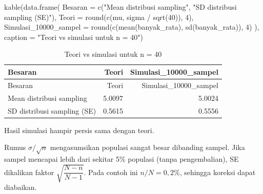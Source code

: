 \documentclass[
  indonesian,
  letterpaper,
]{book}
\newenvironment{Shaded}{\begin{snugshade}}{\end{snugshade}}
\newcommand{\AttributeTok}[1]{\textcolor[rgb]{0.40,0.45,0.13}{#1}}
\newcommand{\DecValTok}[1]{\textcolor[rgb]{0.68,0.00,0.00}{#1}}
\newcommand{\FunctionTok}[1]{\textcolor[rgb]{0.28,0.35,0.67}{#1}}
\newcommand{\NormalTok}[1]{\textcolor[rgb]{0.00,0.23,0.31}{#1}}
\newcommand{\SpecialCharTok}[1]{\textcolor[rgb]{0.37,0.37,0.37}{#1}}
\newcommand{\StringTok}[1]{\textcolor[rgb]{0.13,0.47,0.30}{#1}}
\begin{document}
\begin{Shaded}
\begin{Highlighting}[]
\FunctionTok{kable}\NormalTok{(}\FunctionTok{data.frame}\NormalTok{(}
  \AttributeTok{Besaran =} \FunctionTok{c}\NormalTok{(}\StringTok{"Mean distribusi sampling"}\NormalTok{, }\StringTok{"SD distribusi sampling (SE)"}\NormalTok{),}
  \AttributeTok{Teori   =} \FunctionTok{round}\NormalTok{(}\FunctionTok{c}\NormalTok{(mu, sigma }\SpecialCharTok{/} \FunctionTok{sqrt}\NormalTok{(}\DecValTok{40}\NormalTok{)), }\DecValTok{4}\NormalTok{),}
  \AttributeTok{Simulasi\_10000\_sampel =} \FunctionTok{round}\NormalTok{(}\FunctionTok{c}\NormalTok{(}\FunctionTok{mean}\NormalTok{(banyak\_rata), }\FunctionTok{sd}\NormalTok{(banyak\_rata)), }\DecValTok{4}\NormalTok{)}
\NormalTok{), }\AttributeTok{caption =} \StringTok{"Teori vs simulasi untuk n = 40"}\NormalTok{)}
\end{Highlighting}
\end{Shaded}

\begin{longtable}[]{@{}lrr@{}}
\caption{Teori vs simulasi untuk n = 40}\tabularnewline
\toprule\noalign{}
Besaran & Teori & Simulasi\_10000\_sampel \\
\midrule\noalign{}
\endfirsthead
\toprule\noalign{}
Besaran & Teori & Simulasi\_10000\_sampel \\
\midrule\noalign{}
\endhead
\bottomrule\noalign{}
\endlastfoot
Mean distribusi sampling & 5.0097 & 5.0024 \\
SD distribusi sampling (SE) & 0.5615 & 0.5556 \\
\end{longtable}

Hasil simulasi hampir persis sama dengan teori.

\begin{tcolorbox}[enhanced jigsaw, arc=.35mm, bottomrule=.15mm, bottomtitle=1mm, breakable, colback=white, colbacktitle=quarto-callout-note-color!10!white, colframe=quarto-callout-note-color-frame, coltitle=black, left=2mm, leftrule=.75mm, opacityback=0, opacitybacktitle=0.6, rightrule=.15mm, title=\textcolor{quarto-callout-note-color}{\faInfo}\hspace{0.5em}{Koreksi populasi terhingga}, titlerule=0mm, toprule=.15mm, toptitle=1mm]

Rumus \(\sigma/\sqrt{n}\) mengasumsikan populasi sangat besar dibanding
sampel. Jika sampel mencapai lebih dari sekitar 5\% populasi (tanpa
pengembalian), SE dikalikan faktor \(\sqrt{\dfrac{N-n}{N-1}}\). Pada
contoh ini \(n/N = 0{,}2\%\), sehingga koreksi dapat diabaikan.

\end{tcolorbox}
\end{document}
